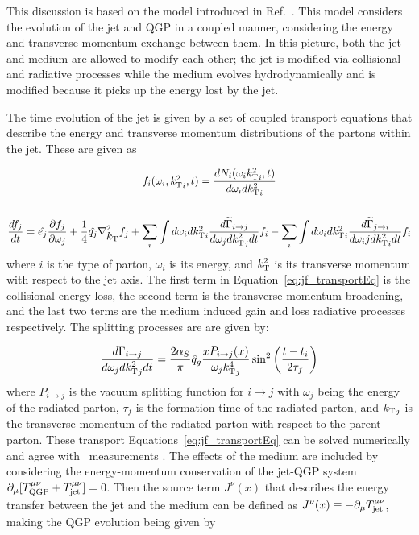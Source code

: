 
This discussion is based on the model introduced in Ref.~\cite{Tachibana:2017syd}.
This model considers the evolution of the jet and QGP in a coupled manner, considering the energy and transverse momentum exchange between them.
In this picture, both the jet and medium are allowed to modify each other; the jet is modified via collisional and radiative processes while the medium evolves hydrodynamically and is modified because it picks up the energy lost by the jet.

The time evolution of the jet is given by a set of coupled transport equations that describe the energy and transverse momentum distributions of the partons within the jet. These are given as

\begin{gather}
f_i (\omega_i, \mbox{$k_{\rm T}^2$}_i, t) = \frac{dN_i (\omega_i \mbox{$k_{\rm T}^2$}_i, t)}{d \omega_i d\mbox{$k_{\rm T}^2$}_i} \\
\nonumber \\
\frac{d f_j}{dt} = \hat{e_j} \frac{\partial f_j}{\partial \omega_j} + \frac{1}{4} \hat{q_j} \nabla_{\mbox{$k_{\rm T}$}}^2 f_j 
 + \sum_i \int d\omega_i d\mbox{$k_{\rm T}^2$}_i \frac{d\widetilde{\Gamma}_{i\rightarrow j} }{d\omega_j d\mbox{$k_{\rm T}^2$}_j dt} f_i 
 - \sum_i \int d\omega_i d\mbox{$k_{\rm T}^2$}_i \frac{d\widetilde{\Gamma}_{j\rightarrow i} }{d\omega_ij d\mbox{$k_{\rm T}^2$}_i dt} f_i
\label{eq:jf_transportEq} 
\end{gather}
where $i$ is the type of parton, $\omega_i$ is its energy, and $\mbox{$k_{\rm T}^2$}$ is its transverse momentum with respect to the jet axis.
The first term in Equation~\ref{eq:jf_transportEq} is the collisional energy loss, the second term is the transverse momentum broadening, and the last two terms are the medium induced gain and loss radiative processes respectively.
The splitting processes are are given by:

\begin{align}
\frac{d\Gamma_{i \rightarrow j}}{d \omega_j d\mbox{$k_{\rm T}^2$}_j dt} = \frac{2\alpha_S}{\pi} \hat{q}_g \frac{x P_{i \rightarrow j} (x)}{\omega_j {k_{\rm T}^4}_j} \sin^2 \left(\dfrac{t - t_i}{2\tau_f} \right)
\end{align}
where $P_{i \rightarrow j} $ is the vacuum splitting function for $i \rightarrow j $ with $\omega_j$ being the energy of the radiated parton, $\tau_f$ is the formation time of the radiated parton, and $\mbox{$k_{\rm T}$}_j$ is the transverse momentum of the radiated parton with respect to the parent parton.
These transport Equations~\ref{eq:jf_transportEq} can be solved numerically and agree with \RAA\ measurements \cite{Aad:2014bxa, Khachatryan:2016jfl, Abelev:2013kqa}.
The effects of the medium are included by considering the energy-momentum conservation of the jet-QGP system $ \partial_\mu [T_{\rm QGP}^{\mu\nu} + T_{\rm jet}^{\mu\nu}] = 0$.
Then the source term $J^\nu(x)$ that describes the energy transfer between the jet and the medium can be defined as $J^\nu(x) \equiv -\partial_\mu  T_{\rm jet}^{\mu\nu}$, making the QGP evolution being given by

